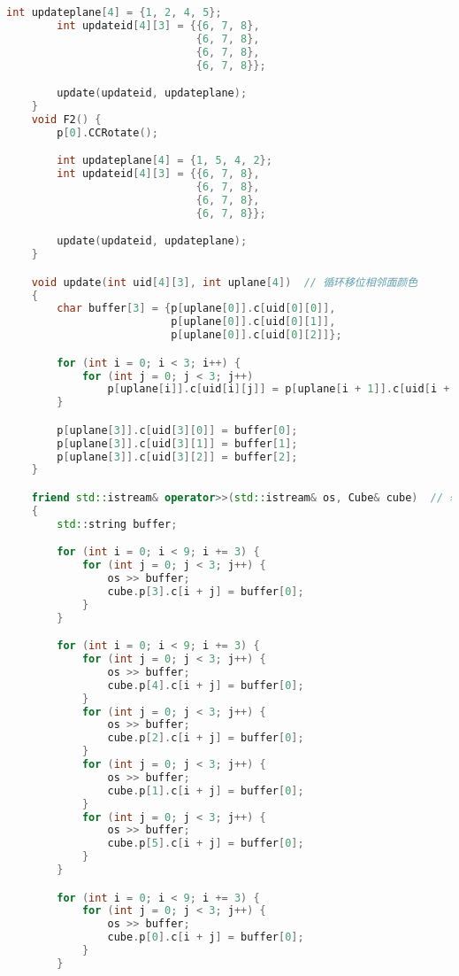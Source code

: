 \begin{lstlisting}[language=C++]
        int updateplane[4] = {1, 2, 4, 5};
        int updateid[4][3] = {{6, 7, 8},
                              {6, 7, 8},
                              {6, 7, 8},
                              {6, 7, 8}};

        update(updateid, updateplane);
    }
    void F2() {
        p[0].CCRotate();

        int updateplane[4] = {1, 5, 4, 2};
        int updateid[4][3] = {{6, 7, 8},
                              {6, 7, 8},
                              {6, 7, 8},
                              {6, 7, 8}};

        update(updateid, updateplane);
    }

    void update(int uid[4][3], int uplane[4])  // 循环移位相邻面颜色
    {
        char buffer[3] = {p[uplane[0]].c[uid[0][0]],
                          p[uplane[0]].c[uid[0][1]],
                          p[uplane[0]].c[uid[0][2]]};

        for (int i = 0; i < 3; i++) {
            for (int j = 0; j < 3; j++)
                p[uplane[i]].c[uid[i][j]] = p[uplane[i + 1]].c[uid[i + 1][j]];
        }

        p[uplane[3]].c[uid[3][0]] = buffer[0];
        p[uplane[3]].c[uid[3][1]] = buffer[1];
        p[uplane[3]].c[uid[3][2]] = buffer[2];
    }

    friend std::istream& operator>>(std::istream& os, Cube& cube)  // 输入
    {
        std::string buffer;

        for (int i = 0; i < 9; i += 3) {
            for (int j = 0; j < 3; j++) {
                os >> buffer;
                cube.p[3].c[i + j] = buffer[0];
            }
        }

        for (int i = 0; i < 9; i += 3) {
            for (int j = 0; j < 3; j++) {
                os >> buffer;
                cube.p[4].c[i + j] = buffer[0];
            }
            for (int j = 0; j < 3; j++) {
                os >> buffer;
                cube.p[2].c[i + j] = buffer[0];
            }
            for (int j = 0; j < 3; j++) {
                os >> buffer;
                cube.p[1].c[i + j] = buffer[0];
            }
            for (int j = 0; j < 3; j++) {
                os >> buffer;
                cube.p[5].c[i + j] = buffer[0];
            }
        }

        for (int i = 0; i < 9; i += 3) {
            for (int j = 0; j < 3; j++) {
                os >> buffer;
                cube.p[0].c[i + j] = buffer[0];
            }
        }


\end{lstlisting}
